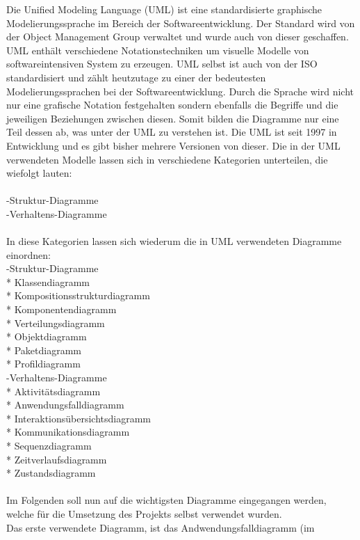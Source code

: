 Die Unified Modeling Language (UML) ist eine standardisierte graphische Modelierungssprache im Bereich der Softwareentwicklung. Der Standard wird von der Object Management Group verwaltet und wurde auch von dieser geschaffen. UML enthält verschiedene Notationstechniken um visuelle Modelle von softwareintensiven System zu erzeugen. UML selbst ist auch von der ISO standardisiert und zählt heutzutage zu einer der bedeutesten Modelierungssprachen bei der Softwareentwicklung. Durch die Sprache wird nicht nur eine grafische Notation festgehalten sondern ebenfalls die Begriffe und die jeweiligen Beziehungen zwischen diesen. Somit bilden die Diagramme nur eine Teil dessen ab, was unter der UML zu verstehen ist.
Die UML ist seit 1997 in Entwicklung und es gibt bisher mehrere Versionen von dieser.
Die in der UML verwendeten Modelle lassen sich in verschiedene Kategorien unterteilen, die wiefolgt lauten:\\
\\
-Struktur-Diagramme\\
-Verhaltens-Diagramme\\
\\
In diese Kategorien lassen sich wiederum die in UML verwendeten Diagramme einordnen:\\
-Struktur-Diagramme\\
    * Klassendiagramm\\
    * Kompositionsstrukturdiagramm\\
    * Komponentendiagramm\\
    * Verteilungsdiagramm\\
    * Objektdiagramm\\
    * Paketdiagramm\\
    * Profildiagramm\\
-Verhaltens-Diagramme\\
    * Aktivitätsdiagramm\\
    * Anwendungsfalldiagramm\\
    * Interaktionsübersichtsdiagramm\\
    * Kommunikationsdiagramm\\
    * Sequenzdiagramm\\
    * Zeitverlaufsdiagramm\\
    * Zustandsdiagramm\\
\\
Im Folgenden soll nun auf die wichtigsten Diagramme eingegangen werden, welche für die Umsetzung des Projekts selbst verwendet wurden.\\
Das erste verwendete Diagramm, ist das Andwendungsfalldiagramm (im
